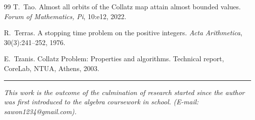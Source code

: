 \documentclass[11pt,a4paper]{article}
\theoremstyle{plain}
\theoremstyle{definition}
\begin{document}
\begin{thebibliography}{99}
T.~Tao.
\newblock Almost all orbits of the {C}ollatz map attain almost bounded values.
\newblock \emph{Forum of Mathematics, Pi}, 10:e12, 2022.

R.~Terras.
\newblock A stopping time problem on the positive integers.
\newblock \emph{Acta Arithmetica}, 30(3):241--252, 1976.

E.~Tzanis.
\newblock Collatz Problem: Properties and algorithms.
\newblock Technical report, CoreLab, NTUA, Athens, 2003.

\end{thebibliography}

\bigskip
\noindent\rule{\textwidth}{0.4pt}

\smallskip
\noindent\textit{This work is the outcome of the culmination of research started since the author was first introduced to the algebra coursework in school. (E-mail: sawon1234@gmail.com).}
\end{document}
